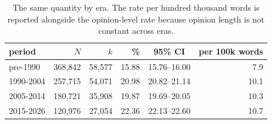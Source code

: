 \begin{table}[t]
\centering\footnotesize
\begin{tabular}{lrrrcr}
\toprule
period & $N$ & $k$ & \% & 95\% CI & per 100k words \\
\midrule
pre-1990 & 368,842 & 58,577 & 15.88 & 15.76--16.00 & 7.9 \\
1990-2004 & 257,715 & 54,071 & 20.98 & 20.82--21.14 & 10.1 \\
2005-2014 & 180,721 & 35,908 & 19.87 & 19.69--20.05 & 10.3 \\
2015-2026 & 120,976 & 27,054 & 22.36 & 22.13--22.60 & 10.7 \\
\bottomrule
\end{tabular}
\caption{The same quantity by era. The rate per hundred thousand words is reported alongside the opinion-level rate because opinion length is not constant across eras.}
\label{tab:prevperiod}
\end{table}
